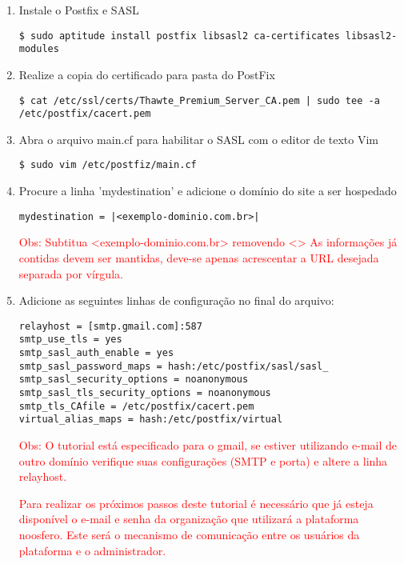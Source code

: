 \begin{enumerate}[label=\alph*)]

\item Instale o Postfix e SASL
\begin{lstlisting}
$ sudo aptitude install postfix libsasl2 ca-certificates libsasl2-modules
\end{lstlisting}

\item Realize a copia do certificado para pasta do PostFix
\begin{lstlisting}
$ cat /etc/ssl/certs/Thawte_Premium_Server_CA.pem | sudo tee -a /etc/postfix/cacert.pem
\end{lstlisting}

\item Abra o arquivo main.cf para habilitar o SASL com o editor de texto Vim
\begin{lstlisting}
$ sudo vim /etc/postfiz/main.cf
\end{lstlisting}

\item Procure a linha 'mydestination' e adicione o domínio do site a ser hospedado
\begin{lstlisting}[style=base]
mydestination = |<exemplo-dominio.com.br>|
\end{lstlisting}

\textcolor{red}{{\scriptsize  Obs: Subtitua <exemplo-dominio.com.br> removendo <> }}
\textcolor{red}{{\scriptsize  As informações já contidas devem ser mantidas, deve-se apenas acrescentar a URL desejada separada por vírgula. }}

\item Adicione as seguintes linhas de configuração no final do arquivo:

\begin{lstlisting}
relayhost = [smtp.gmail.com]:587
smtp_use_tls = yes
smtp_sasl_auth_enable = yes
smtp_sasl_password_maps = hash:/etc/postfix/sasl/sasl_
smtp_sasl_security_options = noanonymous
smtp_sasl_tls_security_options = noanonymous
smtp_tls_CAfile = /etc/postfix/cacert.pem
virtual_alias_maps = hash:/etc/postfix/virtual
\end{lstlisting}

\textcolor{red}{{\scriptsize Obs: O tutorial está especificado para o gmail, se estiver utilizando e-mail de outro domínio verifique suas configurações (SMTP e porta) e altere a linha relayhost.}}

\textcolor{red}{{\scriptsize Para realizar os próximos passos deste tutorial é necessário que já esteja disponível o e-mail e senha da organização que utilizará a 	plataforma noosfero. Este será o mecanismo de comunicação entre os usuários da plataforma e o administrador. }}


\end{enumerate}
